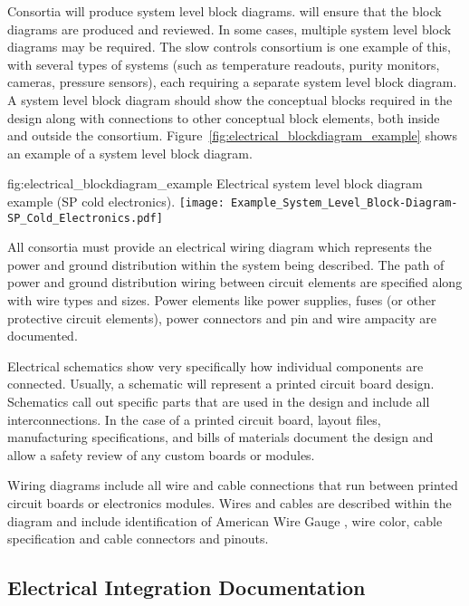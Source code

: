 Consortia will produce system level block diagrams. 
will ensure that the block diagrams are produced and reviewed.  In
some cases, multiple system level block diagrams may be required.  The
slow controls consortium is one example of this, with several types of
systems (such as temperature readouts, purity monitors, cameras,
pressure sensors), each requiring a separate system level block
diagram. A system level block diagram should show the conceptual
blocks required in the design along with connections to other
conceptual block elements, both inside and outside the consortium.
Figure~\ref{fig:electrical_blockdiagram_example} shows an example of a
system level block diagram.
\begin{dunefigure}{fig:electrical_blockdiagram_example}
  {Electrical system level block diagram example (SP cold electronics).}
 \texttt{[image: Example\_System\_Level\_Block-Diagram-SP\_Cold\_Electronics.pdf]}
\end{dunefigure}


All consortia must provide an electrical wiring diagram which
represents the power and ground distribution within the system being
described.  The path of power and ground distribution wiring between
circuit elements are specified along with wire types and sizes.  Power
elements like power supplies, fuses (or other protective circuit
elements), power connectors and pin and wire ampacity are documented.


Electrical schematics show very specifically how individual
components are connected.  Usually, a schematic will represent a
printed circuit board design.  Schematics call out specific
parts that are used in the design and include all interconnections.
In the case of a printed circuit board, layout files, manufacturing
specifications, and bills of materials document
the design and allow a safety review of any custom boards or
modules.


Wiring diagrams include all wire and cable connections that run
between printed circuit boards or electronics modules.  Wires and
cables are described within the diagram and include identification of
American Wire Gauge , wire color, cable specification and
cable connectors and pinouts.





\subsection{Electrical Integration Documentation}
\label{sec:fdsp-coord-integ-electrical}

